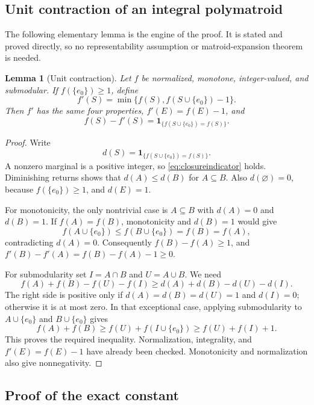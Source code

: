 \documentclass[11pt]{article}
\newtheorem{lemma}[theorem]{Lemma}
\theoremstyle{definition}
\theoremstyle{remark}
\newcommand{\1}{\mathbf 1}
\begin{document}
\subsection{Unit contraction of an integral polymatroid}

The following elementary lemma is the engine of the proof. It is stated and
proved directly, so no representability assumption or matroid-expansion theorem
is needed.

\begin{lemma}[Unit contraction]
\label{lem:contraction}
Let $f$ be normalized, monotone, integer-valued, and submodular. If
$f(\{e_0\})\ge1$, define
\begin{equation}
 f'(S)=\min\{f(S),f(S\cup\{e_0\})-1\}.
 \label{eq:unitcontraction}
\end{equation}
Then $f'$ has the same four properties, $f'(E)=f(E)-1$, and
\begin{equation}
 f(S)-f'(S)=\1_{\{f(S\cup\{e_0\})=f(S)\}}.
 \label{eq:closureindicator}
\end{equation}
\end{lemma}

\begin{proof}
Write
\[
 d(S)=\1_{\{f(S\cup\{e_0\})=f(S)\}}.
\]
A nonzero marginal is a positive integer, so \eqref{eq:closureindicator} holds.
Diminishing returns shows that $d(A)\le d(B)$ for $A\subseteq B$.
Also $d(\varnothing)=0$, because $f(\{e_0\})\ge1$, and $d(E)=1$.

For monotonicity, the only nontrivial case is $A\subseteq B$ with
$d(A)=0$ and $d(B)=1$. If $f(A)=f(B)$, monotonicity and $d(B)=1$ would give
\[
 f(A\cup\{e_0\})\le f(B\cup\{e_0\})=f(B)=f(A),
\]
contradicting $d(A)=0$. Consequently $f(B)-f(A)\ge1$, and
$f'(B)-f'(A)=f(B)-f(A)-1\ge0$.

For submodularity set $I=A\cap B$ and $U=A\cup B$. We need
\[
 f(A)+f(B)-f(U)-f(I)\ge d(A)+d(B)-d(U)-d(I).
\]
The right side is positive only if $d(A)=d(B)=d(U)=1$ and $d(I)=0$;
otherwise it is at most zero. In that exceptional case, applying submodularity
to $A\cup\{e_0\}$ and $B\cup\{e_0\}$ gives
\[
 f(A)+f(B)\ge f(U)+f(I\cup\{e_0\})\ge f(U)+f(I)+1.
\]
This proves the required inequality. Normalization, integrality, and
$f'(E)=f(E)-1$ have already been checked. Monotonicity and normalization also
give nonnegativity.
\end{proof}

\subsection{Proof of the exact constant}
\end{document}
